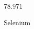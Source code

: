 \documentclass[12pt]{article}
\begin{document}
\hfill{}
\vfill
\begin{center}
  {\fontsize{50}{60}
  }

  78.971

Selenium
\end{center}
\vfill
\end{document}
